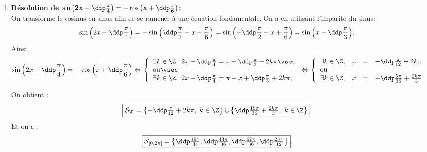 \begin{correction}
\begin{enumerate}
\begin{minipage}[c]{0.45\textwidth}
\begin{center}
\end{center}
\end{minipage}
\item \textbf{R\'esolution de $\mathbf{ \sin{\left(2x-\ddp\frac{\pi}{4}\right)}=-\cos{\left(x+\ddp\frac{\pi}{6}\right)} }$:}\\
\noindent
On transforme le cosinus en sinus afin de se ramener \`a une \'equation fondamentale.
On a en utilisant l'imparit\'e du sinus:
$$
\sin{\left(2x-\ddp\frac{\pi}{4}\right)}=-\sin{\left(\ddp\frac{\pi}{2}-x-\frac{\pi}{6}\right)}
=\sin{\left(-\ddp\frac{\pi}{2}+x+\frac{\pi}{6}\right)}
=\sin{\left(x-\ddp\frac{\pi}{3}\right)}.$$
Ainsi,
$$
\sin{\left(2x-\ddp\frac{\pi}{4}\right)}=-\cos{\left(x+\ddp\frac{\pi}{6}\right)} \Leftrightarrow  \left\lbrace \begin{array}{l}
\exists k\in\Z,\ 2x-\ddp\frac{\pi}{4}=x-\ddp\frac{\pi}{3}+2k\pi\vsec\\
\hbox{ou}\vsec\\
\exists k\in\Z,\ 2x-\ddp\frac{\pi}{4}=\pi-x+\ddp\frac{\pi}{3}+2k\pi,
\end{array}\right.
\Leftrightarrow \left\lbrace\begin{array}{llll}
\exists k\in\Z, &x&=&-\ddp\frac{\pi}{12}+2k\pi\\
\hbox{ou}\\
\exists k\in\Z,& x&=&-\ddp\frac{5\pi}{36}+\frac{2k\pi}{3}.\\
\end{array}\right.$$
\begin{minipage}[c]{0.45\textwidth}
On obtient :
$$\fbox{$\mathcal{S}_{\R}=\left\lbrace -\ddp\frac{\pi}{12}+2k\pi,\ k\in\Z  \right\rbrace\cup \left\lbrace \ddp\frac{19\pi}{36}+\frac{2k\pi}{3},\ k\in\Z  \right\rbrace$}.$$ 
Et on a :
$$\fbox{$\mathcal{S}_{\lbrack 0,2\pi\lbrack}=\left\lbrace \ddp\frac{19\pi}{36}, \ddp\frac{43\pi}{36} ,\ddp\frac{67\pi}{36},\ddp\frac{23\pi}{12} \right\rbrace$}.$$
\end{minipage}
\quad \begin{minipage}[c]{0.45\textwidth}
\begin{center}
\end{center}
\end{minipage}
\end{enumerate}
\end{correction}
